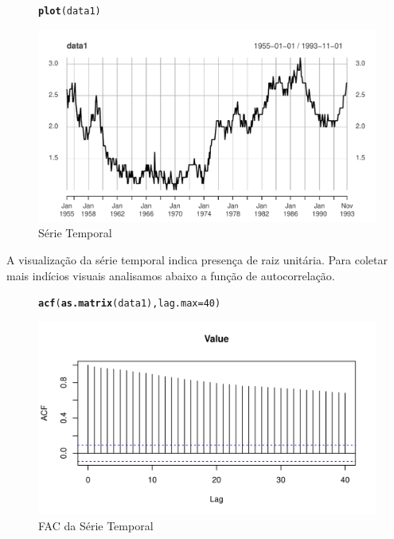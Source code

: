 \documentclass{article}\usepackage[]{graphicx}\usepackage[]{color}
\makeatletter
\def\maxwidth{ %
  \ifdim\Gin@nat@width>\linewidth
    \linewidth
  \else
    \Gin@nat@width
  \fi
}
\newcommand{\hlnum}[1]{\textcolor[rgb]{0.686,0.059,0.569}{#1}}%
\newcommand{\hlstd}[1]{\textcolor[rgb]{0.345,0.345,0.345}{#1}}%
\newcommand{\hlkwc}[1]{\textcolor[rgb]{0.333,0.667,0.333}{#1}}%
\newcommand{\hlkwd}[1]{\textcolor[rgb]{0.737,0.353,0.396}{\textbf{#1}}}%
\newenvironment{kframe}{%
 \def\at@end@of@kframe{}%
 \ifinner\ifhmode%
  \def\at@end@of@kframe{\end{minipage}}%
  \begin{minipage}{\columnwidth}%
 \fi\fi%
 \def\FrameCommand##1{\hskip\@totalleftmargin \hskip-\fboxsep
 \colorbox{shadecolor}{##1}\hskip-\fboxsep
     \hskip-\linewidth \hskip-\@totalleftmargin \hskip\columnwidth}%
 \MakeFramed {\advance\hsize-\width
   \@totalleftmargin\z@ \linewidth\hsize
   \@setminipage}}%
 {\par\unskip\endMakeFramed%
 \at@end@of@kframe}
\newenvironment{knitrout}{}{} %
\makeatother
\begin{document}
            \begin{figure}[H]
            \caption{Série Temporal}
            \centering
\begin{knitrout}
\color{fgcolor}\begin{kframe}
\begin{alltt}
\hlkwd{plot}\hlstd{(data1)}
\end{alltt}
\end{kframe}
\includegraphics[width=\maxwidth]{figure/unnamed-chunk-28-1} 

\end{knitrout}
            \end{figure}
            
            A visualização da série temporal indica presença de raiz unitária. Para coletar mais indícios visuais analisamos abaixo a função de autocorrelação.
            
            \begin{figure}[H]
            \caption{FAC da Série Temporal}
            \centering
\begin{knitrout}
\color{fgcolor}\begin{kframe}
\begin{alltt}
\hlkwd{acf}\hlstd{(}\hlkwd{as.matrix}\hlstd{(data1),} \hlkwc{lag.max}\hlstd{=}\hlnum{40}\hlstd{)}
\end{alltt}
\end{kframe}
\includegraphics[width=\maxwidth]{figure/unnamed-chunk-29-1} 

\end{knitrout}
            \end{figure}
            
\end{document}
